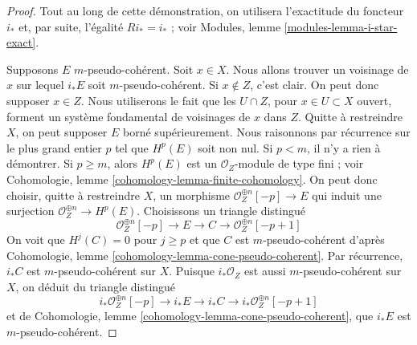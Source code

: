 \begin{proof}
Tout au long de cette démonstration, on utilisera l'exactitude du foncteur $i_*$ et,
par suite, l'égalité $Ri_* = i_*$ ; voir Modules, lemme \ref{modules-lemma-i-star-exact}.

\medskip\noindent
Supposons $E$ $m$-pseudo-cohérent. Soit $x \in X$. Nous allons trouver un voisinage
de $x$ sur lequel $i_*E$ soit $m$-pseudo-cohérent. Si $x \not \in Z$,
c'est clair. On peut donc supposer $x \in Z$. Nous utiliserons le fait
que les $U \cap Z$, pour $x \in U \subset X$ ouvert, forment un système fondamental de
voisinages de $x$ dans $Z$. Quitte à restreindre $X$, on peut supposer $E$
borné supérieurement. Nous raisonnons par récurrence sur
le plus grand entier $p$ tel que $H^p(E)$ soit non nul. Si $p < m$,
il n'y a rien à démontrer. Si $p \geq m$, alors $H^p(E)$ est un
$\mathcal{O}_Z$-module de type fini ; voir
Cohomologie, lemme \ref{cohomology-lemma-finite-cohomology}.
On peut donc choisir, quitte à restreindre $X$, un morphisme
$\mathcal{O}_Z^{\oplus n}[-p] \to E$ qui induit une surjection
$\mathcal{O}_Z^{\oplus n} \to H^p(E)$. Choisissons un triangle distingué
$$
\mathcal{O}_Z^{\oplus n}[-p] \to E \to C \to \mathcal{O}_Z^{\oplus n}[-p + 1]
$$
On voit que $H^j(C) = 0$ pour $j \geq p$ et que $C$ est $m$-pseudo-cohérent
d'après Cohomologie, lemme \ref{cohomology-lemma-cone-pseudo-coherent}.
Par récurrence, $i_*C$ est $m$-pseudo-cohérent sur $X$.
Puisque $i_*\mathcal{O}_Z$ est aussi $m$-pseudo-cohérent sur $X$, on déduit
du triangle distingué
$$
i_*\mathcal{O}_Z^{\oplus n}[-p] \to i_*E \to i_*C \to
i_*\mathcal{O}_Z^{\oplus n}[-p + 1]
$$
et de
Cohomologie, lemme \ref{cohomology-lemma-cone-pseudo-coherent},
que $i_*E$ est $m$-pseudo-cohérent.


\end{proof}
